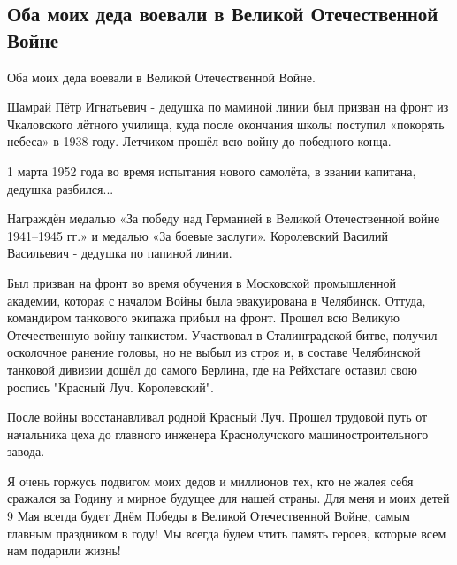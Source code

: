  
 
 
 
 

\subsection{Оба моих деда воевали в Великой Отечественной Войне}
\label{sec:08_05_2021.fb.korolevskaja_natalia.1.den_pobedy_pamjat}

Оба моих деда воевали в Великой Отечественной Войне. 

Шамрай Пётр Игнатьевич - дедушка по маминой линии был призван на фронт из
Чкаловского лётного училища, куда после окончания школы поступил «покорять
небеса» в 1938 году. Летчиком прошёл всю войну до победного конца. 

1 марта 1952 года во время испытания нового самолёта, в звании капитана, дедушка разбился...

Награждён медалью «За победу над Германией в Великой Отечественной войне
1941–1945 гг.» и медалью «За боевые заслуги».  Королевский Василий Васильевич -
дедушка по папиной линии. 

Был призван на фронт во время обучения в Московской промышленной академии,
которая с началом Войны была эвакуирована в Челябинск. Оттуда, командиром
танкового экипажа прибыл на фронт. Прошел всю Великую Отечественную войну
танкистом. Участвовал в Сталинградской битве, получил осколочное ранение
головы, но не выбыл из строя и, в составе Челябинской танковой дивизии дошёл до
самого Берлина, где на Рейхстаге оставил свою роспись "Красный Луч.
Королевский". 

После войны восстанавливал родной Красный Луч. Прошел трудовой путь от
начальника цеха до главного инженера Краснолучского машиностроительного завода. 

Я очень горжусь подвигом моих дедов и миллионов тех, кто не жалея себя сражался
за Родину и мирное будущее для нашей страны. Для меня и моих детей 9 Мая всегда
будет Днём Победы в Великой Отечественной Войне, самым главным праздником в
году! Мы всегда будем чтить память героев, которые всем нам подарили жизнь!
